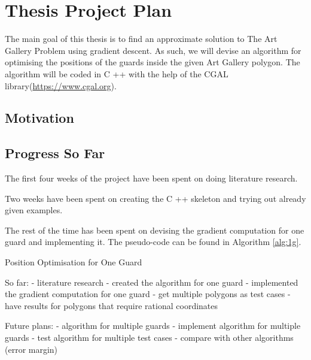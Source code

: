 \section{Thesis Project Plan}
\label{sec:thesis}

The main goal of this thesis is to find an approximate solution to The Art Gallery Problem \cite{o1987art} using gradient descent. As such, we will devise an algorithm for optimising the positions of the guards inside the given Art Gallery polygon. 
The algorithm will be coded in C ++ with the help of the CGAL library(\url{https://www.cgal.org}).

\subsection{Motivation}

\subsection{Progress So Far}
The first four weeks of the project have been spent on doing literature research.

Two weeks have been spent on creating the C ++ skeleton and trying out already given examples.

The rest of the time has been spent on devising the gradient computation for one guard and implementing it.
The pseudo-code can be found in Algorithm \ref{alg:1g}.

\begin{algorithm}
    \begin{algorithmic}[1]
    \caption{Position Optimisation for One Guard}
    \label{alg:1g}

         

            \EndIf
        \EndWhile
    \EndFor
    \end{algorithmic}
\end{algorithm}

So far:
- literature research
- created the algorithm for one guard
- implemented the gradient computation for one guard
- get multiple polygons as test cases
- have results for polygons that require rational coordinates

Future plans:
- algorithm for multiple guards
- implement algorithm for multiple guards
- test algorithm for multiple test cases 
- compare with other algorithms (error margin)